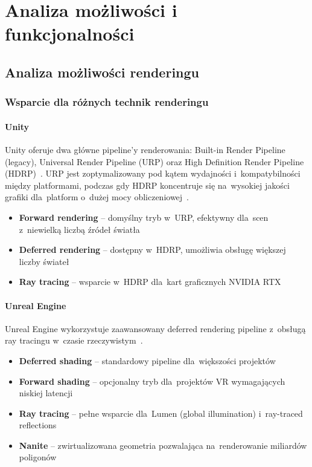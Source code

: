 
\clearpage
\section{Analiza możliwości i funkcjonalności}

\subsection{Analiza możliwości renderingu}

\subsubsection{Wsparcie dla różnych technik renderingu}

\paragraph{Unity}
Unity oferuje dwa główne pipeline'y renderowania: Built-in Render Pipeline (legacy), Universal Render Pipeline (URP) oraz High Definition Render Pipeline (HDRP)~\cite{unity_urp_docs, unity_hdrp_docs}. URP jest zoptymalizowany pod kątem wydajności i~kompatybilności między platformami, podczas gdy HDRP koncentruje się na~wysokiej jakości grafiki dla~platform o~dużej mocy obliczeniowej~\cite{gregory2018game}.

\begin{itemize}
    \item \textbf{Forward rendering} -- domyślny tryb w~URP, efektywny dla~scen z~niewielką liczbą źródeł światła~\cite{unity_urp_docs}
    \item \textbf{Deferred rendering} -- dostępny w~HDRP, umożliwia obsługę większej liczby świateł~\cite{unity_hdrp_docs}
    \item \textbf{Ray tracing} -- wsparcie w~HDRP dla~kart graficznych NVIDIA RTX~\cite{parker2010optix}
\end{itemize}

\paragraph{Unreal Engine}
Unreal Engine wykorzystuje zaawansowany deferred rendering pipeline z~obsługą ray tracingu w~czasie rzeczywistym~\cite{unreal_lumen, unreal_nanite}.

\begin{itemize}
    \item \textbf{Deferred shading} -- standardowy pipeline dla~większości projektów~\cite{gregory2018game}
    \item \textbf{Forward shading} -- opcjonalny tryb dla~projektów VR wymagających niskiej latencji~\cite{anthes2016state}
    \item \textbf{Ray tracing} -- pełne wsparcie dla~Lumen (global illumination) i~ray-traced reflections~\cite{unreal_lumen}
    \item \textbf{Nanite} -- zwirtualizowana geometria pozwalająca na~renderowanie miliardów poligonów~\cite{unreal_nanite}
\end{itemize}


